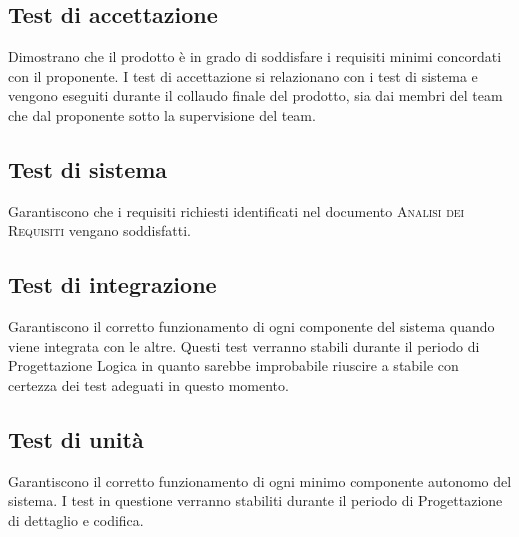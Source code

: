 \documentclass[../piano-di-qualifica.tex]{subfiles}
\begin{document}
\subsection{Test di accettazione}
\label{sub:test_di_accettazione}
Dimostrano che il prodotto è in grado di soddisfare i requisiti minimi concordati con il proponente.
I test di accettazione si relazionano con i test di sistema e vengono eseguiti durante il collaudo finale del prodotto, sia dai membri del team che dal proponente sotto la supervisione del team.

\subsection{Test di sistema}
\label{sub:test_di_sistema}
Garantiscono che i requisiti richiesti identificati nel documento \textsc{Analisi dei Requisiti} vengano soddisfatti. 

\subsection{Test di integrazione}
\label{sub:test_di_integrazione}
Garantiscono il corretto funzionamento di ogni componente del sistema quando viene integrata con le altre.
Questi test verranno stabili durante il periodo di Progettazione Logica in quanto sarebbe improbabile riuscire a stabile con certezza dei test adeguati in questo momento.

\subsection{Test di unità}
\label{sub:test_di_unita}
Garantiscono il corretto funzionamento di ogni minimo componente autonomo del sistema.
I test in questione verranno stabiliti durante il periodo di Progettazione di dettaglio e codifica.
\end{document}
